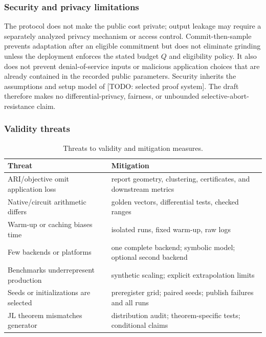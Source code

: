 \documentclass[pdflatex,sn-mathphys-num,iicol]{sn-jnl}
\newcommand{\placeholder}[1]{\textcolor{red!75!black}{[TODO:\allowbreak{} #1]}}
\newcommand{\tpexplain}[1]{}
\theoremstyle{plain}
\theoremstyle{definition}
\theoremstyle{remark}
\begin{document}
\subsubsection{Security and privacy limitations}
\tpexplain{Discuss leakage from output, seed bias/grinding, denial of service, malicious verifier parameters, and trusted setup if applicable.}
The protocol does not make the public cost private; output leakage may require a separately analyzed privacy mechanism or access control. Commit-then-sample prevents adaptation after an eligible commitment but does not eliminate grinding unless the deployment enforces the stated budget $Q$ and eligibility policy. It also does not prevent denial-of-service inputs or malicious application choices that are already contained in the recorded public parameters. Security inherits the assumptions and setup model of \placeholder{selected proof system}. The draft therefore makes no differential-privacy, fairness, or unbounded selective-abort-resistance claim.

\subsubsection{Validity threats}
\begin{table}[!htbp]
\caption{Threats to validity and mitigation measures.}\label{tab:validity-a}
\centering\scriptsize
\begin{tabularx}{\columnwidth}{@{}Y Y@{}}
\toprule
Threat & Mitigation \\
\midrule
ARI/objective omit application loss & report geometry, clustering, certificates, and downstream metrics \\
Native/circuit arithmetic differs & golden vectors, differential tests, checked ranges \\
Warm-up or caching biases time & isolated runs, fixed warm-up, raw logs \\
Few backends or platforms & one complete backend; symbolic model; optional second backend \\
Benchmarks underrepresent production & synthetic scaling; explicit extrapolation limits \\
Seeds or initializations are selected & preregister grid; paired seeds; publish failures and all runs \\
JL theorem mismatches generator & distribution audit; theorem-specific tests; conditional claims \\
\bottomrule
\end{tabularx}
\end{table}
\end{document}
